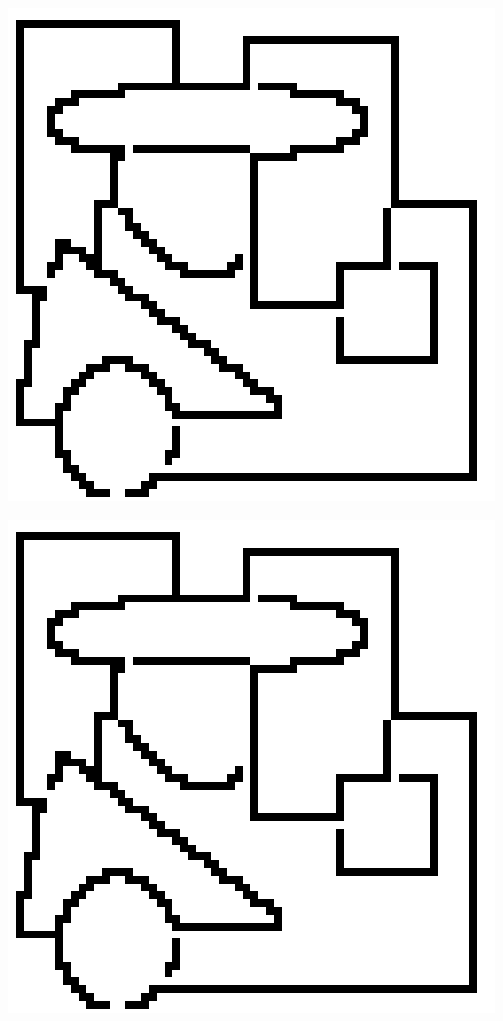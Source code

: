 \begin{multicols}{2}
\begin{minipage}{0.5\linewidth}
\end{minipage}
\begin{minipage}{0.5\linewidth}
	\centering
	\includegraphics[width=0.9\linewidth]{./Experiments/Template/fig/2.png}
\end{minipage}
\begin{minipage}{0.5\linewidth}
	\centering
	\includegraphics[width=0.9\linewidth]{./Experiments/Template/fig/2.png}
\end{minipage}
\lipsum[1]

\end{multicols}